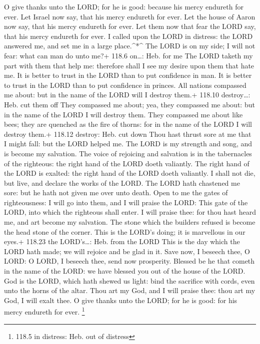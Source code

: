  O give thanks unto the LORD; for he is good: because his
mercy endureth for ever.  Let Israel now say, that his mercy
endureth for ever.  Let the house of Aaron now say, that his
mercy endureth for ever.  Let them now that fear the LORD
say, that his mercy endureth for ever.  I called upon the
LORD in distress: the LORD answered me, and set me in a large
place.\^{}*\^{}  The LORD is on my side; I will not fear:
what can man do unto me?+ 118.6 on\ldots: Heb. for me  The
LORD taketh my part with them that help me: therefore shall I see my
desire upon them that hate me.  It is better to trust in the
LORD than to put confidence in man.  It is better to trust
in the LORD than to put confidence in princes.  All nations
compassed me about: but in the name of the LORD will I destroy them.+
118.10 destroy\ldots: Heb. cut them off  They compassed me
about; yea, they compassed me about: but in the name of the LORD I will
destroy them.  They compassed me about like bees; they are
quenched as the fire of thorns: for in the name of the LORD I will
destroy them.+ 118.12 destroy: Heb. cut down  Thou hast
thrust sore at me that I might fall: but the LORD helped me.
 The LORD is my strength and song, and is become my
salvation.  The voice of rejoicing and salvation is in the
tabernacles of the righteous: the right hand of the LORD doeth
valiantly.  The right hand of the LORD is exalted: the
right hand of the LORD doeth valiantly.  I shall not die,
but live, and declare the works of the LORD.  The LORD hath
chastened me sore: but he hath not given me over unto death.
 Open to me the gates of righteousness: I will go into
them, and I will praise the LORD:  This gate of the LORD,
into which the righteous shall enter.  I will praise thee:
for thou hast heard me, and art become my salvation.  The
stone which the builders refused is become the head stone of the corner.
 This is the LORD's doing; it is marvellous in our eyes.+
118.23 the LORD's\ldots: Heb. from the LORD  This is the
day which the LORD hath made; we will rejoice and be glad in it.
 Save now, I beseech thee, O LORD: O LORD, I beseech thee,
send now prosperity.  Blessed be he that cometh in the name
of the LORD: we have blessed you out of the house of the LORD.
 God is the LORD, which hath shewed us light: bind the
sacrifice with cords, even unto the horns of the altar. 
Thou art my God, and I will praise thee: thou art my God, I will exalt
thee.  O give thanks unto the LORD; for he is good: for his
mercy endureth for ever. \footnote{118.5 in distress: Heb. out of
  distress}


